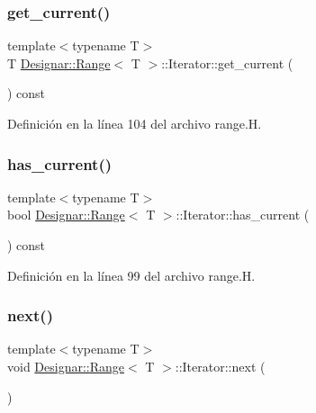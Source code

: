 \subsubsection{\texorpdfstring{get\+\_\+current()}{get\_current()}}
{\footnotesize\ttfamily template$<$typename T$>$ \\
T \hyperlink{class_designar_1_1_range}{Designar\+::\+Range}$<$ T $>$\+::Iterator\+::get\+\_\+current (\begin{DoxyParamCaption}{ }\end{DoxyParamCaption}) const\hspace{0.3cm}{\ttfamily [inline]}}



Definición en la línea 104 del archivo range.\+H.

\mbox{\label{class_designar_1_1_range_1_1_iterator_a9645d6d68aa53949d8c85d2af91e55c9}} 
\subsubsection{\texorpdfstring{has\+\_\+current()}{has\_current()}}
{\footnotesize\ttfamily template$<$typename T$>$ \\
bool \hyperlink{class_designar_1_1_range}{Designar\+::\+Range}$<$ T $>$\+::Iterator\+::has\+\_\+current (\begin{DoxyParamCaption}{ }\end{DoxyParamCaption}) const\hspace{0.3cm}{\ttfamily [inline]}}



Definición en la línea 99 del archivo range.\+H.

\mbox{\label{class_designar_1_1_range_1_1_iterator_ad337cc1a463bd9ebea6691efdc5b7b4f}} 
\subsubsection{\texorpdfstring{next()}{next()}}
{\footnotesize\ttfamily template$<$typename T$>$ \\
void \hyperlink{class_designar_1_1_range}{Designar\+::\+Range}$<$ T $>$\+::Iterator\+::next (\begin{DoxyParamCaption}{ }\end{DoxyParamCaption})\hspace{0.3cm}{\ttfamily [inline]}}



